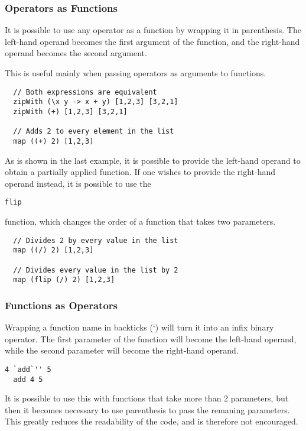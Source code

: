\documentclass{article}
\def\code#1{\begin{footnotesize}\texttt{#1}\end{footnotesize}}
\begin{document}
\subsubsection{Operators as Functions}

It is possible to use any operator as a function by wrapping it in parenthesis.
The left-hand operand becomes the first argument of the function, and the right-hand operand becomes the second argument.

This is useful mainly when passing operators as arguments to functions.

\begin{lstlisting}
  // Both expressions are equivalent
  zipWith (\x y -> x + y) [1,2,3] [3,2,1]
  zipWith (+) [1,2,3] [3,2,1]

  // Adds 2 to every element in the list
  map ((+) 2) [1,2,3]
\end{lstlisting}

As is shown in the last example, it is possible to provide the left-hand operand to obtain a partially applied function.
If one wishes to provide the right-hand operand instead, it is possible to use the \code{flip} function, which changes the order of a function that takes two parameters.

\begin{lstlisting}
  // Divides 2 by every value in the list
  map ((/) 2) [1,2,3]

  // Divides every value in the list by 2
  map (flip (/) 2) [1,2,3]
\end{lstlisting}

\subsubsection{Functions as Operators}

Wrapping a function name in backticks (\lq) will turn it into an infix binary operator.
The first parameter of the function will become the left-hand operand, while the second parameter will become the right-hand operand.

\begin{lstlisting}[escapechar=']
  4 `add`'' 5
  add 4 5
\end{lstlisting}

It is possible to use this with functions that take more than 2 parameters, but then it becomes necessary to use parenthesis to pass the remaning parameters.
This greatly reduces the readability of the code, and is therefore not encouraged.
\end{document}
